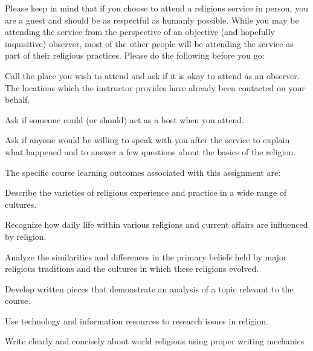 Please keep in mind that if you choose to attend a religious service in person, you are a guest and should be as respectful as humanly possible. While you may be attending the service from the perspective of an objective (and hopefully inquisitive) observer, most of the other people will be attending the service as part of their religious practices. Please do the following before you go:
\begin{enumerate*}
	\item Call the place you wish to attend and ask if it is okay to attend as an observer. The locations which the instructor provides have already been contacted on your behalf.
	\item Ask if someone could (or should) act as a host when you attend.
	\item Ask if anyone would be willing to speak with you after the service to explain what happened and to answer a few questions about the basics of the religion.
\end{enumerate*}

The specific course learning outcomes associated with this assignment are:
\begin{itemize*}
	\item Describe the varieties of religious experience and practice in a wide range of cultures. 
	\item Recognize how daily life within various religions and current affairs are influenced by religion.
	\item Analyze the similarities and differences in the primary beliefs held by major religious traditions and the cultures in which these religions evolved.
	\item Develop written pieces that demonstrate an analysis of a topic relevant to the course.
	\item Use technology and information resources to research issues in religion.
	\item Write clearly and concisely about world religions using proper writing mechanics
\end{itemize*}

